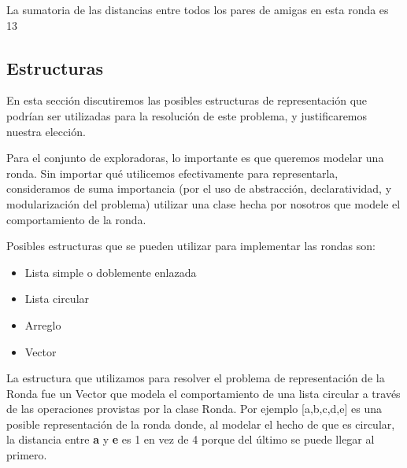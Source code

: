 \documentclass[11pt]{article}
\begin{document}
\begin{figure}[H]
\begin{center}
\end{center}
\end{figure}

La sumatoria de las distancias entre todos los pares de amigas en esta ronda es 13

\subsection{Estructuras}

En esta sección discutiremos las posibles estructuras de representación que podrían ser utilizadas
para la resolución de este problema, y justificaremos nuestra elección.

Para el conjunto de exploradoras, lo importante es que queremos modelar una ronda. Sin importar
qué utilicemos efectivamente para representarla, consideramos de suma importancia (por el uso de abstracción,
declaratividad, y modularización del problema) utilizar una clase hecha por nosotros que modele el 
comportamiento de la ronda.

Posibles estructuras que se pueden utilizar para implementar las rondas son: 
\begin{itemize}
\item Lista simple o doblemente enlazada
\item Lista circular
\item Arreglo
\item Vector
\end{itemize}
La estructura que utilizamos para resolver el problema de representación de la Ronda 
fue un Vector que modela el comportamiento de una 
lista circular a través de las operaciones provistas por la clase Ronda. Por ejemplo [a,b,c,d,e] es una 
posible representación de la ronda donde, al modelar el hecho de que es circular,
la distancia entre \textbf{a} y \textbf{e} es 1 en vez de 4 porque del último se puede llegar al primero.
\end{document}
